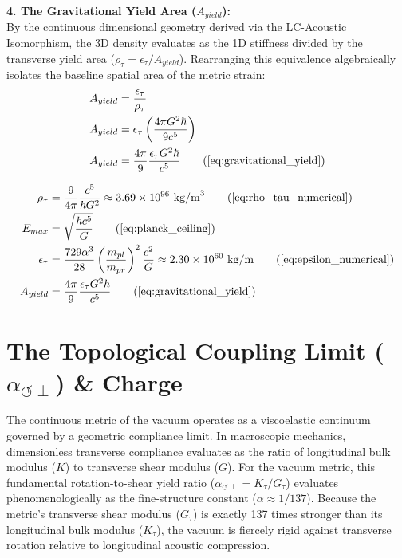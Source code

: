 \documentclass[11pt, a4paper]{article}
\begin{document}
\textbf{4. The Gravitational Yield Area ($A_{yield}$):} \\
By the continuous dimensional geometry derived via the LC-Acoustic Isomorphism, the 3D density evaluates as the 1D stiffness divided by the transverse yield area ($\rho_{\tau} = \epsilon_{\tau} / A_{yield}$). Rearranging this equivalence algebraically isolates the baseline spatial area of the metric strain:
\begin{align}
    A_{yield} &= \frac{\epsilon_{\tau}}{\rho_{\tau}} \label{eq:area_isolation} \\
    A_{yield} &= \epsilon_{\tau} \left( \frac{4\pi G^2 \hbar}{9 c^5} \right) \label{eq:area_substitution} \\
    A_{yield} &= \frac{4\pi}{9} \frac{\epsilon_{\tau} G^2 \hbar}{c^5} \tag{\ref{eq:gravitational_yield}}
\end{align}

\begin{tcolorbox}[recallbox, title={\ref{box:continuum_constants}. Absolute Continuum Constants}]
\begin{align}
    \rho_{\tau} &= \frac{9}{4\pi} \frac{c^5}{\hbar G^2} \approx 3.69 \times 10^{96} \text{ kg/m}^3 \tag{\ref{eq:rho_tau_numerical}} \\
    E_{max} &= \sqrt{\frac{\hbar c^5}{G}} \tag{\ref{eq:planck_ceiling}} \\
    \epsilon_{\tau} &= \frac{729 \alpha^3}{28} \left( \frac{m_{pl}}{m_{pr}} \right)^2 \frac{c^2}{G} \approx 2.30 \times 10^{60} \text{ kg/m} \tag{\ref{eq:epsilon_numerical}} \\
    A_{yield} &= \frac{4\pi}{9} \frac{\epsilon_{\tau} G^2 \hbar}{c^5} \tag{\ref{eq:gravitational_yield}}
\end{align}
\end{tcolorbox}

\section{The Topological Coupling Limit ($\alpha_{\circlearrowleft \perp}$) \& Charge}
\label{sec:deriv_fine_structure}

The continuous metric of the vacuum operates as a viscoelastic continuum governed by a geometric compliance limit.  In macroscopic mechanics, dimensionless transverse compliance evaluates as the ratio of longitudinal bulk modulus ($K$) to transverse shear modulus ($G$). For the vacuum metric, this fundamental rotation-to-shear yield ratio ($\alpha_{\circlearrowleft \perp} = K_\tau / G_\tau$) evaluates phenomenologically as the fine-structure constant ($\alpha \approx 1/137$). Because the metric's transverse shear modulus ($G_\tau$) is exactly 137 times stronger than its longitudinal bulk modulus ($K_\tau$), the vacuum is fiercely rigid against transverse rotation relative to longitudinal acoustic compression.
\end{document}
